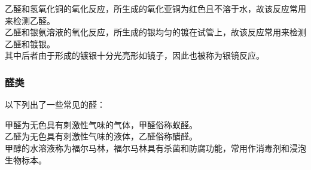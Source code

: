\documentclass[UTF8]{ctexart}
\begin{document}
\newpage

    乙醛和氢氧化铜的氧化反应，所生成的氧化亚铜为红色且不溶于水，故该反应常用来检测乙醛。\\[3mm]
    乙醛和银氨溶液的氧化反应，所生成的银均匀的镀在试管上，故该反应常用来检测乙醛和镀银。\\[3mm]
    其中后者由于形成的镀银十分光亮形如镜子，因此也被称为银镜反应。\\

\subsubsection{醛类}
    以下列出了一些常见的醛：\vspace{8pt}
    \begin{center}
        \qquad\quad
        \qquad\quad
    \end{center}\vspace{10pt}
    甲醛为无色具有刺激性气味的气体，甲醛俗称蚁醛。\\[3mm]
    乙醛为无色具有刺激性气味的液体，乙醛俗称醋醛。\\[3mm]
    甲醇的水溶液称为福尔马林，福尔马林具有杀菌和防腐功能，常用作消毒剂和浸泡生物标本。

\newpage
\end{document}
